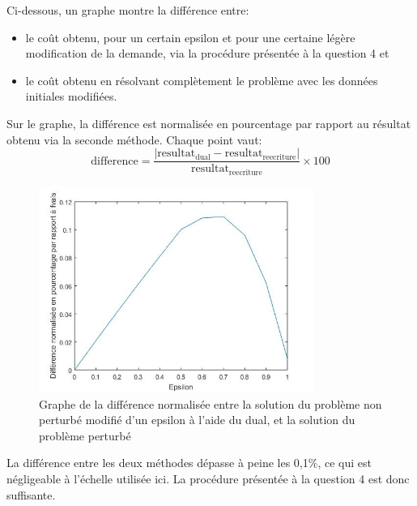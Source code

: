 Ci-dessous, un graphe montre la différence entre:
\begin{itemize}
    \item le coût obtenu, pour un certain epsilon et pour une certaine légère modification de la demande, via la procédure présentée à la question 4 et
    \item le coût obtenu en résolvant complètement le problème avec les données initiales modifiées.
\end{itemize}

Sur le graphe, la différence est normalisée en pourcentage par rapport au résultat obtenu via la seconde méthode. Chaque point vaut:
\begin{equation*}
\mathrm{difference} =
\frac{\left|\mathrm{resultat}_\mathrm{dual} - \mathrm{resultat}_\mathrm{reecriture}\right|}{\mathrm{resultat}_\mathrm{reecriture}} \times 100 
\end{equation*}
 
\begin{figure}[h]
    \centering
    \includegraphics[width=0.8\textwidth]{graphes/graphq5.jpg}
    \caption{Graphe de la différence normalisée entre la solution du problème non perturbé modifié d'un epsilon à l'aide du dual, et la solution du problème perturbé}
    \label{fig:q5}
\end{figure}

La différence entre les deux méthodes dépasse à peine les 0,1\%, ce qui est négligeable à l'échelle utilisée ici. La procédure présentée à la question 4 est donc suffisante.
